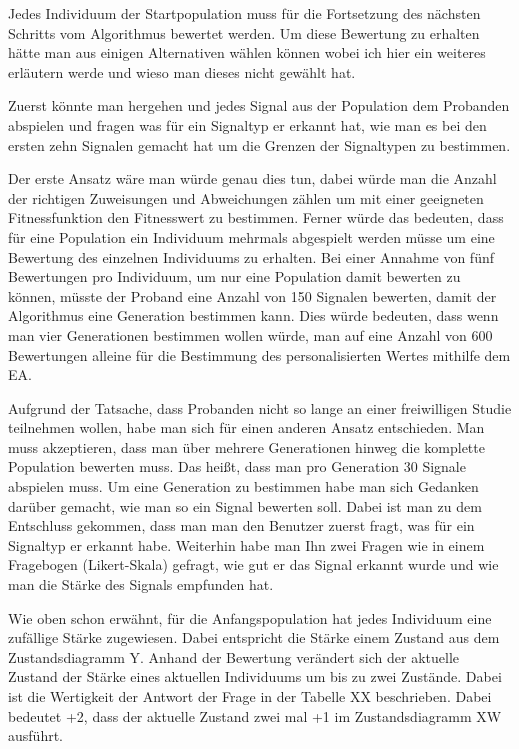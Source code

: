 Jedes Individuum der Startpopulation muss f{\"u}r die Fortsetzung des n{\"a}chsten Schritts vom Algorithmus bewertet werden.
Um diese Bewertung zu erhalten h{\"a}tte man aus einigen Alternativen w{\"a}hlen k{\"o}nnen wobei ich hier ein weiteres erl{\"a}utern werde und wieso man dieses nicht gew{\"a}hlt hat. 

Zuerst k{\"o}nnte man hergehen und jedes Signal aus der Population dem Probanden abspielen und fragen was f{\"u}r ein Signaltyp er erkannt hat, wie man es bei den ersten zehn Signalen gemacht hat um die Grenzen der Signaltypen zu bestimmen. 

Der erste Ansatz w{\"a}re man w{\"u}rde genau dies tun, dabei w{\"u}rde man die Anzahl der richtigen Zuweisungen und Abweichungen z{\"a}hlen um mit einer geeigneten Fitnessfunktion den Fitnesswert zu bestimmen. Ferner w{\"u}rde das bedeuten, dass f{\"u}r eine Population ein Individuum mehrmals abgespielt werden m{\"u}sse um eine Bewertung des einzelnen Individuums zu erhalten. Bei einer Annahme von f{\"u}nf Bewertungen pro Individuum, um nur eine Population damit bewerten zu k{\"o}nnen, m{\"u}sste der Proband eine Anzahl von 150 Signalen bewerten, damit der Algorithmus eine Generation bestimmen kann. Dies w{\"u}rde bedeuten, dass wenn man vier Generationen bestimmen wollen w{\"u}rde, man auf eine Anzahl von 600 Bewertungen alleine f{\"u}r die Bestimmung des personalisierten Wertes mithilfe dem EA. 

Aufgrund der Tatsache, dass Probanden nicht so lange an einer freiwilligen Studie teilnehmen wollen, habe man sich f{\"u}r einen anderen Ansatz entschieden. Man muss akzeptieren, dass man {\"u}ber mehrere Generationen hinweg die komplette Population bewerten muss. Das hei{\ss}t, dass man pro Generation 30 Signale abspielen muss. Um eine Generation zu bestimmen habe man sich Gedanken dar{\"u}ber gemacht, wie man so ein Signal bewerten soll. Dabei ist man zu dem Entschluss gekommen, dass man man den Benutzer zuerst fragt, was f{\"u}r ein Signaltyp er erkannt habe. Weiterhin habe man Ihn zwei Fragen wie in einem Fragebogen (Likert-Skala) gefragt, wie gut er das Signal erkannt wurde und wie man die St{\"a}rke des Signals empfunden hat. 

Wie oben schon erw{\"a}hnt,  f{\"u}r die Anfangspopulation hat jedes Individuum eine zuf{\"a}llige St{\"a}rke zugewiesen. Dabei entspricht die St{\"a}rke einem Zustand aus dem Zustandsdiagramm Y. Anhand der Bewertung ver{\"a}ndert sich der aktuelle Zustand der St{\"a}rke eines aktuellen Individuums um bis zu zwei Zust{\"a}nde. Dabei ist die Wertigkeit der Antwort der Frage in der Tabelle XX beschrieben. Dabei bedeutet +2, dass der aktuelle Zustand zwei mal +1 im Zustandsdiagramm XW ausf{\"u}hrt. 

